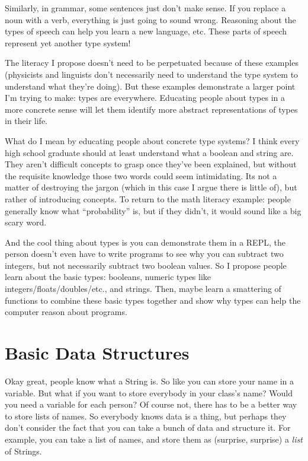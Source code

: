 \documentclass[12pt]{article}
\begin{document}

      Similarly, in grammar, some sentences just don't make sense. If you replace a noun with a verb, everything is just going to sound wrong. Reasoning about the types of speech can help you learn a new language, etc. These parts of speech represent yet another type system! 

      The literacy I propose doesn't need to be perpetuated because of these examples (physicists and linguists don't necessarily need to understand the type system to understand what they're doing). But these examples demonstrate a larger point I'm trying to make: types are everywhere. Educating people about types in a more concrete sense will let them identify more abstract representations of types in their life. 

      What do I mean by educating people about concrete type systems? I think every high school graduate should at least understand what a boolean and string are. They aren't difficult concepts to grasp once they've been explained, but without the requisite knowledge those two words could seem intimidating. Its not a matter of destroying the jargon (which in this case I argue there is little of), but rather of introducing concepts. To return to the math literacy example: people generally know what ``probability'' is, but if they didn't, it would sound like a big scary word. 

      And the cool thing about types is you can demonstrate them in a REPL, the person doesn't even have to write programs to see why you can subtract two integers, but not necessarily subtract two boolean values. So I propose people learn about the basic types: booleans, numeric types like integers/floats/doubles/etc., and strings. Then, maybe learn a smattering of functions to combine these basic types together and show why types can help the computer reason about programs. 

    \section{Basic Data Structures}

      Okay great, people know what a String is. So like you can store your name in a variable. But what if you want to store everybody in your class's name? Would you need a variable for each person? Of course not, there has to be a better way to store lists of names. So everybody knows data is a thing, but perhaps they don't consider the fact that you can take a bunch of data and structure it. For example, you can take a list of names, and store them as (surprise, surprise) a \textit{list} of Strings. 
\end{document}
